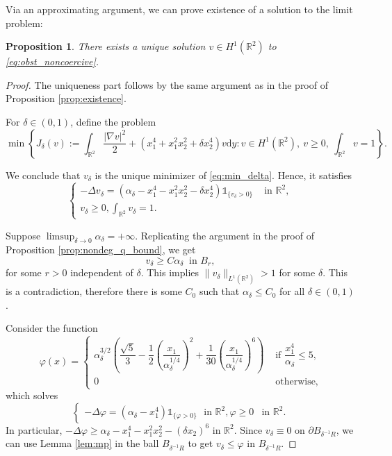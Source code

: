 \documentclass[10pt,a4paper]{article}
\newcommand{\RR}{\mathbb{R}}
\newcommand{\faskip}{\hspace{8pt}}
\newtheorem{prop}[thm]{Proposition}
\numberwithin{equation}{section}
\begin{document}
Via an approximating argument, we can prove existence of a solution to the limit problem:
\begin{prop}
	\label{prop:exist_noncoercive}
	There exists a unique solution $ v \in H^{1}(\RR^{2}) $ to \eqref{eq:obst_noncoercive}.
\end{prop}
\begin{proof}
	The uniqueness part follows by the same argument as in the proof of Proposition \ref{prop:existence}.

	For $ \delta \in (0,1) $, define the problem
	\begin{equation}
	\label{eq:min_delta}
		\min \left\{ J_{\delta}(v) := \int_{\RR^{2}} \frac{|\nabla v|^{2}}{2} + \left( x_1^{4} + x_1^{2}x_2^{2} + \delta x_2^{4} \right)  v \mathrm{d}y: v\in H^{1}(\RR^{2}),~ v\geq 0, ~ \int_{\RR^{2}}v = 1  \right\}.
	\end{equation}

	We conclude that $ v_{\delta} $ is the unique minimizer of \eqref{eq:min_delta}. Hence, it satisfies
	\begin{equation}
		\label{eq:obstacle_delta}
		\begin{cases}
			-\Delta v_{\delta} = \left( \alpha_{\delta} - x_1^{4} - x_1^{2}x_2^{2} - \delta x_2^{4}	\right)\mathbb{1}_{\{v_{\delta} > 0 \}} & \text{ in }\RR^{2},\\
			v_{\delta} \geq 0, \int_{\RR^{2}}v_{\delta} = 1. &
		\end{cases}
	\end{equation}
	
	Suppose $ \limsup_{\delta \rightarrow 0}\alpha_{\delta} = +\infty $. Replicating the argument in the proof of Proposition \ref{prop:nondeg_q_bound}, we get 
	\begin{equation}
		\label{eq:inf_noncoercive}
		v_{\delta} \geq C\alpha_{\delta} ~\text{ in }B_r,
	\end{equation}
for some $ r > 0 $ independent of $ \delta $. This implies $ \|v_{\delta} \|_{L^{1}(\RR^{2})} > 1$ for some $ \delta $. This is a contradiction, therefore there is some $ C_0 $ such that $ \alpha_{\delta} \leq C_0 $ for all $ \delta \in (0,1) $. 

	Consider the function
	\[\varphi(x) = \begin{cases}
		\alpha_{\delta}^{3/2} \left( \dfrac{\sqrt{5}}{3} - \dfrac{1}{2} \left( \dfrac{x_1}{\alpha_{\delta}^{1/4}} \right)^{2} +\dfrac{1}{30} \left( \dfrac{x_1}{\alpha_{\delta}^{1/4}} \right)^{6}\right) & \text{ if }  \dfrac{x_1^{4}}{\alpha_{\delta}} \leq 5, \\
		0 & \text{ otherwise,}
	\end{cases}\]
which solves 
	\[
		\begin{cases}
			-\Delta \varphi = \left( \alpha_{\delta} - x_1^{4} \right) \mathbb{1}_{\{\varphi > 0\}} \faskip \text{in } \RR^{2},
			\varphi \geq 0 & \text{in }\RR^{2}.
		\end{cases}
	\]
	In particular, $ -\Delta \varphi \geq \alpha_{\delta} - x_1^{4} - x_1^{2}x_2^{2} - (\delta x_2)^{6} $ in $ \RR^{2} $. Since $ v_{\delta} \equiv 0 $ on $ \partial B_{\delta^{-1} R} $, we can use Lemma \ref{lem:mp} in the ball $ B_{\delta^{-1}R} $ to get $ v_{\delta} \leq \varphi $ in $ B_{\delta^{-1}R} $. 


\end{proof}
\end{document}
